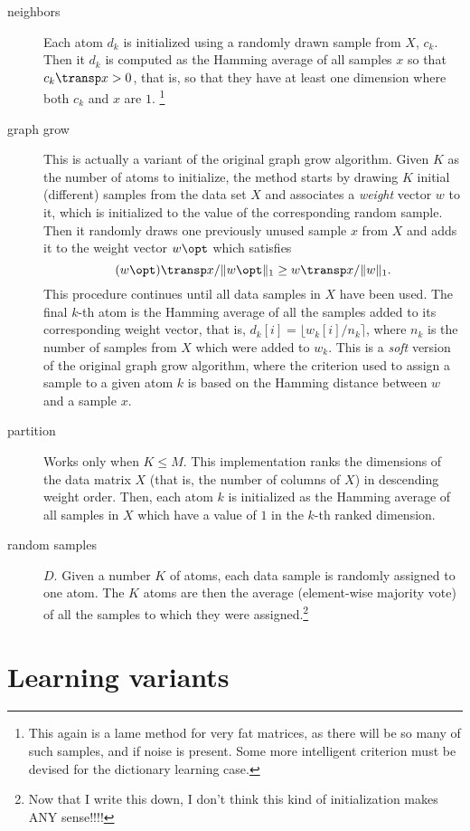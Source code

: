 \documentclass[a4paper,11pt]{article}
\begin{document}
\begin{description}
\item[neighbors] Each atom $d_k$ is initialized using a randomly drawn sample from $X$, $c_k$. Then
  it $d_k$ is
  computed as the Hamming average of all samples $x$ so that $c_k\transp x > 0$, that is, so that
  they have at least one dimension where both $c_k$ and $x$ are $1$. \footnote{This again is a lame method for
  very fat matrices, as there will be so many of such samples, and if noise is present. Some more
  intelligent criterion must be devised for the dictionary learning case.}
\item[graph grow] This is actually a variant of the original graph grow algorithm. Given $K$ as the
  number of atoms to initialize, the method starts by drawing $K$ initial (different) samples from the
  data set $X$ and associates a \emph{weight} vector $w$ to it, which is initialized to the value of the
  corresponding random sample. Then it randomly draws one previously unused sample $x$ from $X$ and adds
  it to the weight vector $w\opt$ which satisfies
$$(w\opt)\transp x/\|w\opt\|_1 \geq
  w\transp x/\|w\|_1.$$ This procedure continues until all data samples in $X$ have been used. The final $k$-th atom is the Hamming average of all the samples added to its corresponding
  weight vector, that is, $d_k[i] = \lfloor w_k[i] / n_k \rceil$, where $n_k$ is the number of
  samples from $X$ which were added to $w_k$. This is a \emph{soft} version of the original graph grow algorithm, where the
  criterion used to assign a sample to a given atom $k$ is based on the Hamming distance between $w$
  and a sample $x$.
\item[partition] Works only when $K \leq M$. This implementation ranks the 
  dimensions of the data matrix $X$ (that is, the number of columns of $X$) in descending weight order. Then, each atom
  $k$ is initialized as the Hamming average of all samples in $X$ which have a value of $1$ in the $k$-th
  ranked dimension.
\item[random samples] $D$. Given a number $K$ of atoms, each data sample is randomly assigned to one
  atom. The $K$ atoms are then the average (element-wise majority vote) of all the samples to which
  they were assigned.\footnote{Now that I write this down, I don't think this kind of initialization makes ANY sense!!!!}
\end{description}

\section{Learning variants}
\end{document}
